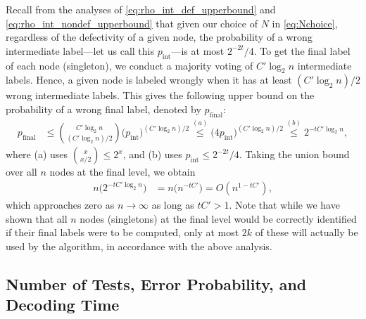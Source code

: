 Recall from the analyses of \eqref{eq:rho_int_def_upperbound} and \eqref{eq:rho_int_nondef_upperbound} that given our choice of $N$ in \eqref{eq:Nchoice}, regardless of the defectivity of a given node, the probability of a wrong intermediate label---let us call this $p_{\text{int}}$---is at most $2^{-2t}/4$. To get the final label of each node (singleton), we conduct a majority voting of $C'\log_2n$ intermediate labels. Hence, a given node is labeled wrongly when it has at least $(C'\log_2n)/2$ wrong intermediate labels. This gives the following upper bound on the probability of a wrong final label, denoted by $p_{\text{final}}$:
\begin{align}
    p_{\text{final}}
    &\leq{C'\log_2n\choose (C'\log_2n)/2}\big(p_{\text{int}}\big)^{(C'\log_2n)/2}
    \stackrel{(a)}{\leq}\big(4p_{\text{int}}\big)^{(C'\log_2n)/2}
    \stackrel{(b)}{\leq}2^{-tC'\log_2n},
\end{align}
where (a) uses ${x \choose x/2} \le 2^x$, and (b) uses $p_{\text{int}}\leq2^{-2t}/4$. Taking the union bound over all $n$ nodes at the final level, we obtain
\begin{align}
    n\big(2^{-tC'\log_2n}\big)
    &=n\big(n^{-tC'}\big)
    =O(n^{1-tC'}),
\end{align}
which approaches zero as $n\rightarrow\infty$ as long as $tC' > 1$. Note that while we have shown that all $n$ nodes (singletons) at the final level would be correctly identified if their final labels were to be computed, only at most $2k$ of these will actually be used by the algorithm, in accordance with the above analysis.


\subsection{Number of Tests, Error Probability, and Decoding Time}

